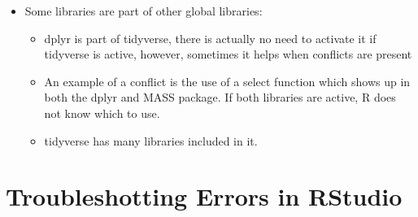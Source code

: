 \documentclass[
  letterpaper,
  DIV=11,
  numbers=noendperiod]{scrreprt}
\providecommand{\tightlist}{%
  \setlength{\itemsep}{0pt}\setlength{\parskip}{0pt}}\usepackage{longtable,booktabs,array}
\begin{document}
\begin{itemize}
\tightlist
\item
  Some libraries are part of other global libraries:

  \begin{itemize}
  \tightlist
  \item
    dplyr is part of tidyverse, there is actually no need to activate it
    if tidyverse is active, however, sometimes it helps when conflicts
    are present
  \item
    An example of a conflict is the use of a select function which shows
    up in both the dplyr and MASS package. If both libraries are active,
    R does not know which to use.
  \item
    tidyverse has many libraries included in it.
  \end{itemize}
\end{itemize}

\section{Troubleshotting Errors in
RStudio}\label{troubleshotting-errors-in-rstudio}
\end{document}

